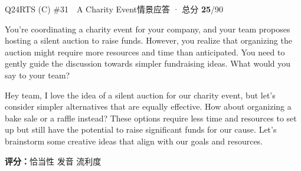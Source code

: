 \begin{qblock}{Q24\quad RTS (C) \#31\ \ A Charity Event}{情景应答 · 总分 \textcolor{cAccent}{\bfseries 25}/90}
\begin{promptbox}
You're coordinating a charity event for your company, and your team proposes hosting a silent auction to raise funds. However, you realize that organizing the auction might require more resources and time than anticipated. You need to gently guide the discussion towards simpler fundraising ideas. What would you say to your team?
\end{promptbox}
\begin{modelbox}
Hey team, I love the idea of a silent auction for our charity event, but let's consider simpler alternatives that are equally effective. How about organizing a bake sale or a raffle instead? These options require less time and resources to set up but still have the potential to raise significant funds for our cause. Let's brainstorm some creative ideas that align with our goals and resources.
\end{modelbox}
\asrlegend
\begin{asrbox}
                                                                
\end{asrbox}
\smallskip
{\small\textbf{评分：}恰当性  \quad\textperiodcentered\quad 发音  \quad\textperiodcentered\quad 流利度 }
\end{qblock}

